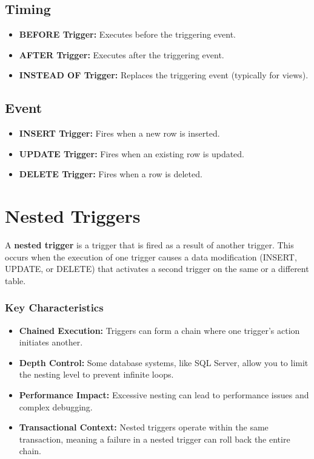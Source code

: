 \documentclass{article}
\begin{document}
\subsection*{Timing}
\begin{itemize}
    \item \textbf{BEFORE Trigger:} Executes before the triggering event.
    \item \textbf{AFTER Trigger:} Executes after the triggering event.
    \item \textbf{INSTEAD OF Trigger:} Replaces the triggering event (typically for views).
\end{itemize}

\subsection*{Event}
\begin{itemize}
    \item \textbf{INSERT Trigger:} Fires when a new row is inserted.
    \item \textbf{UPDATE Trigger:} Fires when an existing row is updated.
    \item \textbf{DELETE Trigger:} Fires when a row is deleted.
\end{itemize}

\section*{Nested Triggers}

A \textbf{nested trigger} is a trigger that is fired as a result of another trigger. This occurs when the execution of one trigger causes a data modification (INSERT, UPDATE, or DELETE) that activates a second trigger on the same or a different table.

\subsubsection*{Key Characteristics}
\begin{itemize}
    \item \textbf{Chained Execution:} Triggers can form a chain where one trigger's action initiates another.
    \item \textbf{Depth Control:} Some database systems, like SQL Server, allow you to limit the nesting level to prevent infinite loops.
    \item \textbf{Performance Impact:} Excessive nesting can lead to performance issues and complex debugging.
    \item \textbf{Transactional Context:} Nested triggers operate within the same transaction, meaning a failure in a nested trigger can roll back the entire chain.
\end{itemize}
\end{document}
